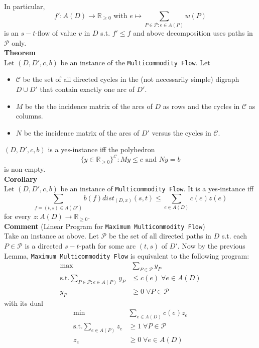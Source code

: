 \documentclass[a4paper, 12pt]{article}
\begin{document}
	In particular, \[f': A(D) \to \mathbb{R}_{\geq 0} \text{ with } e\mapsto \sum_{P \in \mathcal{P}: e \in A(P)} w(P)\]
	is an $s-t$-flow of value $v$ in $D$ s.t. $f' \leq f$ and above decomposition uses paths in $\mathcal{P}$ only.\\
	\textbf{Theorem}\\
	Let $(D, D', c, b)$ be an instance of the \texttt{Multicommodity Flow}. Let \begin{itemize}
		\item $\mathcal{C}$ be the set of all directed cycles in the (not necessarily simple) digraph $D \cup D'$ that contain exactly one arc of $D'$. 
		\item $M$ be the the incidence matrix of the arcs of $D$ as rows and the cycles in $\mathcal{C}$ as columns.
		\item $N$ be the incidence matrix of the arcs of $D'$ versus the cycles in $\mathcal{C}$.
	\end{itemize}
	$(D,D',c,b)$ is a yes-instance iff the polyhedron \[\{y \in \mathbb{R}_{\geq 0}\}^\mathcal{C}: My \leq c \text{ and } Ny = b\] is non-empty.\\
	\textbf{Corollary}\\
	Let $(D,D',c,b)$ be an instance of \texttt{Multicommodity Flow}. It is a yes-instance iff \[\sum_{f = (t,s)\in A(D')} b(f)dist_(D,x)(s,t) \leq \sum_{e \in A(D)} c(e)z(e)\] for every $z: A(D) \to \mathbb{R}_{\geq 0}$.\\
	\textbf{Comment} (Linear Program for \texttt{Maximum Multicommodity Flow})\\
	Take an instance as above. Let $\mathcal{P}$ be the set of all directed paths in $D$ s.t. each $P \in \mathcal{P}$ is a directed $s-t$-path for some arc $(t,s)$ of $D'$. Now by the previous Lemma, \texttt{Maximum Multicommodity Flow} is equivalent to the following program: \begin{align*}
		\max &\sum_{P \in \mathcal{P}} y_P\\
		\text{s.t.} \sum_{P \in \mathcal{P}: e \in A(P)} y_P &\leq c(e) \; \forall e \in A(D)\\
		y_P &\geq 0 \; \forall P \in \mathcal{P}
	\end{align*}
	with its dual \begin{align*}
		\min &\sum_{e \in A(D)} c(e)z_e\\
		\text{s.t.} \sum_{e \in A(P)} z_e & \geq 1 \; \forall P \in \mathcal{P}\\
		z_e &\geq 0 \; \forall e \in A(D)
	\end{align*}
\end{document}
